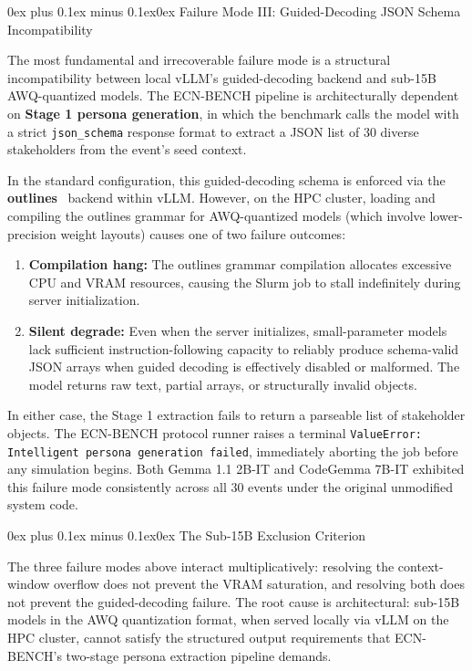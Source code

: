 \documentclass[11pt,journal,onecolumn]{IEEEtran}
\makeatletter
\renewcommand\subsubsection{\@startsection{subsubsection}{3}{\parindent}%
  {0ex plus 0.1ex minus 0.1ex}{0ex}%
  {\normalfont\normalsize\bfseries\itshape}}
\makeatother
\begin{document}
\subsubsection{Failure Mode III: Guided-Decoding JSON Schema Incompatibility}
\label{sec:schema_bypass}

The most fundamental and irrecoverable failure mode is a structural incompatibility between local vLLM's guided-decoding backend and sub-15B AWQ-quantized models. The ECN-BENCH pipeline is architecturally dependent on \textbf{Stage 1 persona generation}, in which the benchmark calls the model with a strict \texttt{json\_schema} response format to extract a JSON list of 30 diverse stakeholders from the event's seed context.

In the standard configuration, this guided-decoding schema is enforced via the \textbf{outlines}~\cite{vllm_guided} backend within vLLM. However, on the HPC cluster, loading and compiling the outlines grammar for AWQ-quantized models (which involve lower-precision weight layouts) causes one of two failure outcomes:
\begin{enumerate}
    \item \textbf{Compilation hang:} The outlines grammar compilation allocates excessive CPU and VRAM resources, causing the Slurm job to stall indefinitely during server initialization.
    \item \textbf{Silent degrade:} Even when the server initializes, small-parameter models lack sufficient instruction-following capacity to reliably produce schema-valid JSON arrays when guided decoding is effectively disabled or malformed. The model returns raw text, partial arrays, or structurally invalid objects.
\end{enumerate}

In either case, the Stage 1 extraction fails to return a parseable list of stakeholder objects. The ECN-BENCH protocol runner raises a terminal \texttt{ValueError: Intelligent persona generation failed}, immediately aborting the job before any simulation begins. Both Gemma 1.1 2B-IT and CodeGemma 7B-IT exhibited this failure mode consistently across all 30 events under the original unmodified system code.

\subsubsection{The Sub-15B Exclusion Criterion}

The three failure modes above interact multiplicatively: resolving the context-window overflow does not prevent the VRAM saturation, and resolving both does not prevent the guided-decoding failure. The root cause is architectural: sub-15B models in the AWQ quantization format, when served locally via vLLM on the HPC cluster, cannot satisfy the structured output requirements that ECN-BENCH's two-stage persona extraction pipeline demands.
\end{document}
